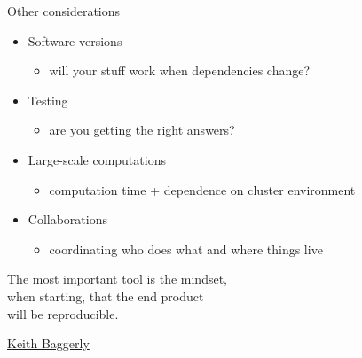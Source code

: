 \documentclass[aspectratio=169,12pt,t]{beamer}
\begin{document}
\begin{frame}[c]{Other considerations}

  \begin{itemize}
    \itemsep12pt
  \item Software versions
    \begin{itemize}
    \item[] {\lolit will your stuff work when dependencies change?}
    \end{itemize}
  \item Testing
    \begin{itemize}
    \item[] {\lolit are you getting the right answers?}
    \end{itemize}
  \item Large-scale computations
    \begin{itemize}
    \item[] {\lolit computation time + dependence on cluster environment}
    \end{itemize}
  \item Collaborations
    \begin{itemize}
    \item[] {\lolit coordinating who does what and where things live}
    \end{itemize}
  \end{itemize}


\end{frame}






\begin{frame}[c]{}

\begin{center}
\large
The most important tool is the {\hilit mindset},\\
when starting, that the end product \\
will be reproducible.
\end{center}

\hfill
{\lolit
{\textendash} \href{https://odin.mdacc.tmc.edu/~kabaggerly/}{Keith Baggerly}
}

\end{frame}
\end{document}
